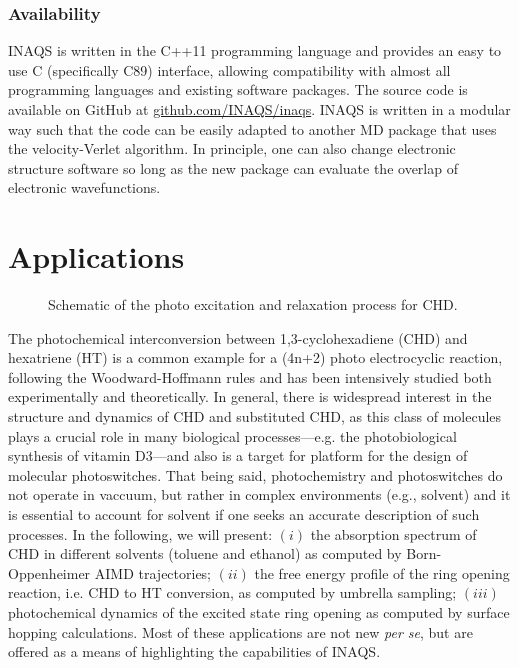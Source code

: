 \documentclass[journal=jctcce,manuscript=article,layout=traditional]{achemso}
\begin{document}
\subsubsection{Availability}
%
INAQS is written in the C++11 programming language and provides an easy to use C  (specifically C89) interface, allowing compatibility with almost all programming languages and existing software packages.
The source code is available on GitHub at \url{github.com/INAQS/inaqs}.
INAQS is written in a modular way such that the code can be easily adapted to another MD package that uses the velocity-Verlet algorithm.
%
%
In principle, one can also change electronic structure software so long as the new package can evaluate the overlap of electronic wavefunctions.


\section{Applications}\label{sec:applications}


\begin{figure}
    \centering
     \caption{\label{fig:CHDscheme}Schematic of the photo excitation and relaxation process for CHD.}
\end{figure}



%
%
%
%
%
%
%
%
%
%
%
%
%
%

%
%
%
%
%
%
%
%




%
The photochemical interconversion between 1,3-cyclohexadiene (CHD) and hexatriene (HT) is a common example for a (4n+2) photo electrocyclic reaction, following the Woodward-Hoffmann rules
and has been intensively studied\cite{deb2011:CHDReview} both experimentally\cite{trulson1987femtosecond,rudakov2009ground,weber2006:CHD} and theoretically\cite{garavelli2001:chd,xing1999:chd,tamura2006:CHDdynamics}. 
In general, there is widespread interest in the structure and dynamics of CHD and substituted
CHD, as this class of molecules plays a crucial role in many biological processes---e.g. the photobiological synthesis of vitamin D3---and also is a target for platform for the design of molecular photoswitches.
That being said, photochemistry and photoswitches do not operate in vaccuum, but rather in complex environments (e.g., solvent) and it is essential to account for solvent if one seeks an accurate description of such processes.
%
In the following, we will present: $(i)$  the absorption spectrum of CHD in different solvents (toluene and ethanol) as computed by Born-Oppenheimer AIMD trajectories; $(ii)$ 
%
the free energy profile of the ring opening reaction, i.e. CHD to HT conversion, as computed by  umbrella sampling; $(iii)$ 
photochemical dynamics of the excited state ring opening as computed by surface hopping calculations.  Most of these applications are not new \cite{NewtonxQMMM,groenhof2015:qmmmPMF,turbomole} \emph{per se}, but are offered as a means of highlighting the capabilities of INAQS.  
\end{document}
